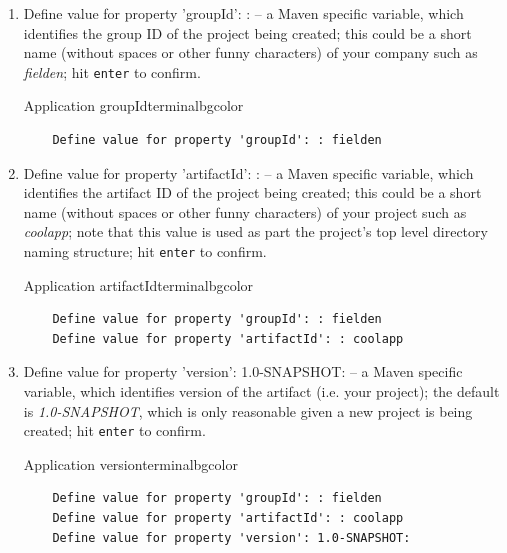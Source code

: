   \begin{enumerate}
    \item Define value for property 'groupId': : -- a Maven specific variable, which identifies the group ID of the project being created; this could be a short name (without spaces or other funny characters) of your company such as \emph{fielden}; hit \texttt{enter} to confirm.
      
    \begin{code}{Application groupId}{\label{lst:archetype-groupId}}{terminalbgcolor}
      \begin{lstlisting}
	Define value for property 'groupId': : fielden		
      \end{lstlisting}
    \end{code}

    \item Define value for property 'artifactId': : -- a Maven specific variable, which identifies the artifact ID of the project being created; this could be a short name (without spaces or other funny characters) of your project such as \emph{coolapp}; note that this value is used as part the project's top level directory naming structure; hit \texttt{enter} to confirm.
    \vspace*{-20pt}
    \begin{code}{Application artifactId}{\label{lst::archetype-archetypeId}}{terminalbgcolor}
      \begin{lstlisting}
	Define value for property 'groupId': : fielden		
	Define value for property 'artifactId': : coolapp
      \end{lstlisting}
    \end{code}

    \item Define value for property 'version': 1.0-SNAPSHOT: -- a Maven specific variable, which identifies version of the artifact (i.e. your project); the default is \emph{1.0-SNAPSHOT}, which is only reasonable given a new project is being created; hit \texttt{enter} to confirm.
    \vspace*{-20pt}
    \begin{code}{Application version}{\label{lst::archetype-version}}{terminalbgcolor}
      \begin{lstlisting}
	Define value for property 'groupId': : fielden		
	Define value for property 'artifactId': : coolapp
	Define value for property 'version': 1.0-SNAPSHOT:
      \end{lstlisting}
    \end{code}


\end{enumerate}
